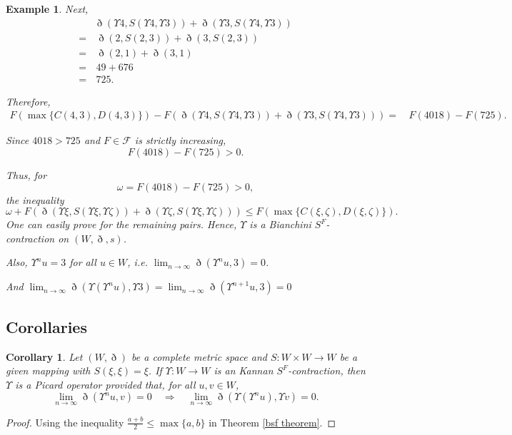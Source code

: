 \documentclass[pdflatex,sn-mathphys-num]{sn-jnl}%
\theoremstyle{thmstyleone}%
\theoremstyle{thmstyletwo}%
\newtheorem{example}{Example}%
\newtheorem{corollary}[theorem]{Corollary}
\theoremstyle{thmstylethree}%
\begin{document}
\begin{example}
Next,
\begin{align*}
&\eth(\Upsilon 4,S(\Upsilon 4,\Upsilon  3))+\eth(\Upsilon 3,S(\Upsilon 4,\Upsilon  3))\\
=&\,\eth(2,S(2,3))+\eth(3,S(2,3))\\
=&\,\eth(2,1)+\eth(3,1)\\
=&\,49+676\\
=&\,725.
\end{align*}

Therefore,
\begin{align*}
F\left(\max\{C(4,3),D(4,3)\}\right)
- F\left(\eth(\Upsilon 4,S(\Upsilon 4,\Upsilon  3))+\eth(\Upsilon 3,S(\Upsilon 4,\Upsilon  3))\right)
=&\,F(4018)-F(725).
\end{align*}

Since $4018>725$ and $F\in\mathcal F$ is strictly increasing,
\[
F(4018)-F(725)>0.
\]

Thus, for
\[
\omega  =F(4018)-F(725)>0,
\]
the inequality
\[
\omega  +F\left(\eth(\Upsilon \xi,S(\Upsilon \xi,\Upsilon \zeta))+\eth(\Upsilon \zeta,S(\Upsilon \xi,\Upsilon \zeta))\right)
\le
F\left(\max\{C(\xi ,\zeta),D(\xi ,\zeta)\}\right).
\]
One can easily prove for the remaining pairs. Hence, $\Upsilon $ is a \textit{Bianchini $S^F$-contraction} on $(W,\eth,s)$.

Also, $\Upsilon^n u=3$ for all $u\in W$, i.e. $\lim_{n\to\infty}\eth(\Upsilon^n u,3)=0$.

And $\lim_{n\to\infty}\eth(\Upsilon(\Upsilon^n u),\Upsilon  3)=\lim_{n\to\infty}\eth(\Upsilon^{n+1} u,3)=0$
\end{example}
 
\subsection{Corollaries}
 \begin{corollary}\label{bsfcol11}
         Let $(W,\eth)$ be a complete metric space and $S:W\times W \to W$ be a given mapping  with $S(\xi,\xi)=\xi$. 
If $\Upsilon  : W \to W$ is an \textit{Kannan $S^F$-contraction}, then $\Upsilon $ is a \textit{Picard operator} provided that, for all $u,v \in W$,
\[
\lim_{n \to \infty} \eth(\Upsilon^n u, v) = 0 
\quad \Longrightarrow \quad 
\lim_{n \to \infty} \eth(\Upsilon(\Upsilon^n u), \Upsilon  v) = 0.
\]
\end{corollary}
\begin{proof}
    Using the inequality $\frac{a+b}{2}\le \max\{a,b\}$ in Theorem \ref{bsf theorem}.
\end{proof}
\end{document}
